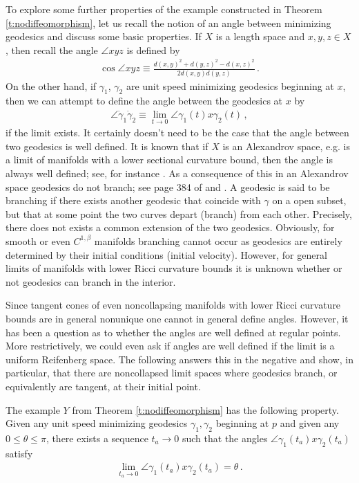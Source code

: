 \documentclass[11pt]{article}
\begin{document}
To explore some further properties of the example constructed in Theorem \ref{t:nodiffeomorphism}, let us recall the notion of an angle between minimizing geodesics and discuss some basic properties.  If $X$ is a length space and $x,y,z\in X$, then recall the angle $\angle xyz$ is defined by
\begin{align}
 \cos\angle xyz\equiv\frac{d(x,y)^2+d(y,z)^2-d(x,z)^2}{2d(x,y)d(y,z)}\, .
\end{align}
On the other hand, if $\gamma_1$, $\gamma_2$ are unit speed minimizing geodesics beginning at $x$, then we can attempt to define the angle between the geodesics at $x$ by
\begin{align}
 \angle\dot\gamma_1\dot\gamma_2\equiv \lim_{t\to 0}\angle\gamma_1(t)x\gamma_2(t)\, ,
\end{align}
if the limit exists.  It certainly doesn't need to be the case that the angle between two geodesics is well defined.  It is known that if $X$ is an Alexandrov space, e.g. is a limit of manifolds with a lower sectional curvature bound, then the angle is always well defined; see, for instance \cite{BGP}.  As a consequence of this in an Alexandrov space geodesics do not branch; see page 384 of \cite{GvPe} and \cite{BGP}.
A geodesic is said to be branching if there exists another geodesic that coincide with $\gamma$ on a open
subset, but  that at some point the two curves depart (branch) from each other.  Precisely, there does not
exists a common extension of the two geodesics.  Obviously, for smooth or even $C^{1,\beta}$ manifolds branching cannot occur as geodesics are entirely determined
by their initial conditions (initial velocity).  However, for general limits of manifolds with lower Ricci curvature bounds it is unknown whether or not
geodesics can branch in the interior.

Since tangent cones of even noncollapsing manifolds with lower Ricci curvature bounds are in general nonunique one cannot in general define angles.  However, it has been a question as to whether the angles are well defined at regular points.  More restrictively, we could even ask if angles are well defined if the limit is a uniform Reifenberg space.  The following answers this in the negative and show, in particular, that there are noncollapsed limit spaces where geodesics branch, or equivalently are tangent, at their initial point.

\begin{theorem}\label{t:nonunique_angle}
 The example $Y$ from Theorem \ref{t:nodiffeomorphism} has the following property.  Given any unit speed minimizing geodesics $\gamma_1,\gamma_2$ beginning at $p$ and given any $0\leq\theta\leq\pi$, there exists a sequence $t_a\to 0$ such that the angles $\angle \gamma_1(t_a)x\gamma_2(t_a)$ satisfy
\begin{align}
 \lim_{t_a\to 0}\angle \gamma_1(t_a)x\gamma_2(t_a) =\theta\, .
\end{align}
\end{theorem}
\end{document}
